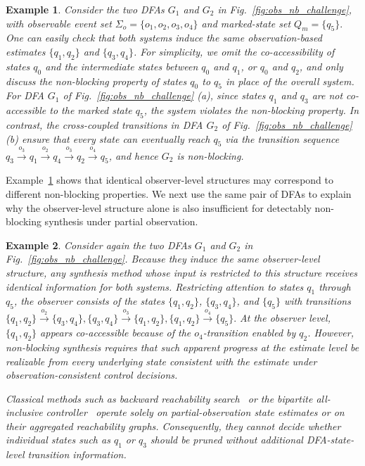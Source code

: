 \documentclass[twocolumn]{autart}
\newtheorem{myexm}{Example}
\begin{document}
\begin{myexm}\label{ex:obs_nb_challenge_cnb}
Consider the two DFAs $G_1$ and $G_2$ in Fig.~\ref{fig:obs_nb_challenge}, with observable event set
$
    \Sigma_o = \{ o_1, o_2, o_3, o_4 \}
$
and marked-state set
$
    Q_m=\{ q_5 \}.
$
One can easily check that both systems induce the same observation-based estimates $\{ q_1, q_2 \}$ and $\{ q_3, q_4 \}$.
For simplicity, we omit the co-accessibility of states $q_0$ and the intermediate states between $q_0$ and $q_1$, or $q_0$ and $q_2$, and only discuss the non-blocking property of states $q_0$ to $q_5$ in place of the overall system.
For DFA $G_1$ of Fig.~\ref{fig:obs_nb_challenge} (a), since states $q_1$ and $q_3$ are not co-accessible to the marked state $q_5$, the system violates the non-blocking property.
In contrast, the cross-coupled transitions in DFA $G_2$ of Fig.~\ref{fig:obs_nb_challenge} (b) ensure that every state can eventually reach $q_5$ via the transition sequence $q_3 \xrightarrow{o_3} q_1 \xrightarrow{o_2} q_4 \xrightarrow{o_3} q_2 \xrightarrow{o_4} q_5$, and hence $G_2$ is non-blocking.
\end{myexm}

Example~\ref{ex:obs_nb_challenge_cnb} shows that identical observer-level structures may correspond to different non-blocking properties.
We next use the same pair of DFAs to explain why the observer-level structure alone is also insufficient for detectably non-blocking synthesis under partial observation.

\begin{myexm}\label{ex:obs_based_structure_insufficient}
Consider again the two DFAs $G_1$ and $G_2$ in Fig.~\ref{fig:obs_nb_challenge}.
Because they induce the same observer-level structure, any synthesis method whose input is restricted to this structure receives identical information for both systems.
Restricting attention to states $q_1$ through $q_5$, the observer consists of the states $\{q_1, q_2\}$, $\{q_3, q_4\}$, and $\{q_5\}$ with transitions
$
\{q_1,q_2\} \xrightarrow{o_2} \{q_3,q_4\},
\{q_3,q_4\} \xrightarrow{o_3} \{q_1,q_2\},
\{q_1,q_2\} \xrightarrow{o_4} \{q_5\}.
$
At the observer level, $\{q_1, q_2\}$ appears co-accessible because of the $o_4$-transition enabled by $q_2$.
However, non-blocking synthesis requires that such apparent progress at the estimate level be realizable from every underlying state consistent with the estimate under observation-consistent control decisions.

Classical methods such as backward reachability search~\cite{thuijsman2020transformational,thuijsman2024reducing} or the bipartite all-inclusive controller~\cite{yin2016synthesis} operate solely on partial-observation state estimates or on their aggregated reachability graphs.
Consequently, they cannot decide whether individual states such as $q_1$ or $q_3$ should be pruned without additional DFA-state-level transition information.

\end{myexm}
\end{document}

